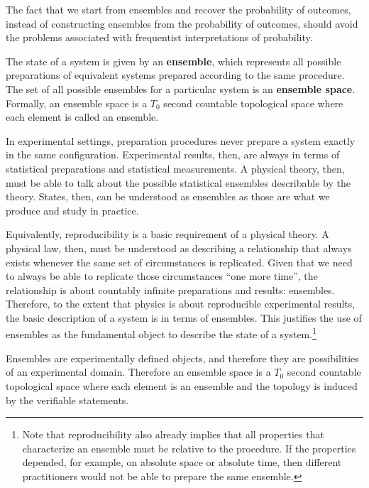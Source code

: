 The fact that we start from ensembles and recover the probability of outcomes, instead of constructing ensembles from the probability of outcomes, should avoid the problems associated with frequentist interpretations of probability.

\begin{mathSection}
	\begin{axiom} 
		The state of a system is given by an \textbf{ensemble}, which represents all possible preparations of equivalent systems prepared according to the same procedure. The set of all possible ensembles for a particular system is an \textbf{ensemble space}. Formally, an ensemble space is a $T_0$ second countable topological space where each element is called an ensemble.
	\end{axiom}
	
	\begin{justification}
		In experimental settings, preparation procedures never prepare a system exactly in the same configuration. Experimental results, then, are always in terms of statistical preparations and statistical measurements. A physical theory, then, must be able to talk about the possible statistical ensembles describable by the theory. States, then, can be understood as ensembles as those are what we produce and study in practice.
		
		Equivalently, reproducibility is a basic requirement of a physical theory. A physical law, then, must be understood as describing a relationship that always exists whenever the same set of circumstances is replicated. Given that we need to always be able to replicate those circumstances ``one more time'', the relationship is about countably infinite preparations and results: ensembles. Therefore, to the extent that physics is about reproducible experimental results, the basic description of a system is in terms of ensembles. This justifies the use of ensembles as the fundamental object to describe the state of a system.\footnote{Note that reproducibility also already implies that all properties that characterize an ensemble must be relative to the procedure. If the properties depended, for example, on absolute space or absolute time, then different practitioners would not be able to prepare the same ensemble.}
		
		Ensembles are experimentally defined objects, and therefore they are possibilities of an experimental domain. Therefore an ensemble space is a $T_0$ second countable topological space where each element is an ensemble and the topology is induced by the verifiable statements.
	\end{justification}
\end{mathSection}

